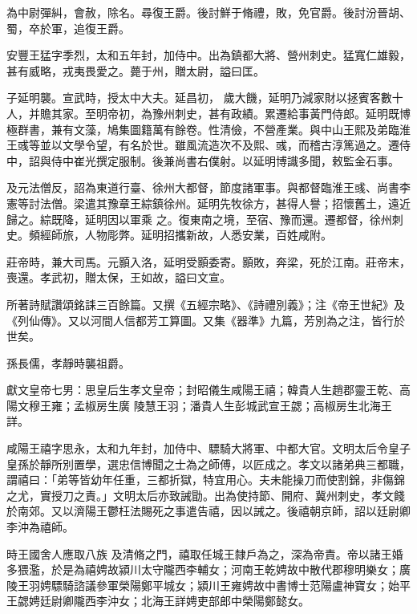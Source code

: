 \begin{pinyinscope}
 為中尉彈糾，會赦，除名。尋復王爵。後討鮮于脩禮，敗，免官爵。後討汾晉胡、蜀，卒於軍，追復王爵。



 安豐王猛字季烈，太和五年封，加侍中。出為鎮都大將、營州刺史。猛寬仁雄毅，甚有威略，戎夷畏愛之。薨于州，贈太尉，謚曰匡。



 子延明襲。宣武時，授太中大夫。延昌初，
 歲大饑，延明乃減家財以拯賓客數十人，并贍其家。至明帝初，為豫州刺史，甚有政績。累遷給事黃門侍郎。延明既博極群書，兼有文藻，鳩集圖籍萬有餘卷。性清儉，不營產業。與中山王熙及弟臨淮王彧等並以文學令望，有名於世。雖風流造次不及熙、彧，而稽古淳篤過之。遷侍中，詔與侍中崔光撰定服制。後兼尚書右僕射。以延明博識多聞，敕監金石事。



 及元法僧反，詔為東道行臺、徐州大都督，節度諸軍事。與都督臨淮王彧、尚書李憲等討法僧。梁遣其豫章王綜鎮徐州。延明先牧徐方，甚得人譽；招懷舊土，遠近歸之。綜既降，延明因以軍乘
 之。復東南之境，至宿、豫而還。遷都督，徐州刺史。頻經師旅，人物彫弊。延明招攜新故，人悉安業，百姓咸附。



 莊帝時，兼大司馬。元顥入洛，延明受顥委寄。顥敗，奔梁，死於江南。莊帝末，喪還。孝武初，贈太保，王如故，謚曰文宣。



 所著詩賦讚頌銘誄三百餘篇。又撰《五經宗略》、《詩禮別義》；注《帝王世紀》及《列仙傳》。又以河間人信都芳工算圖。又集《器準》九篇，芳別為之注，皆行於世矣。



 孫長儒，孝靜時襲祖爵。



 獻文皇帝七男：思皇后生孝文皇帝；封昭儀生咸陽王禧；韓貴人生趙郡靈王乾、高陽文穆王雍；孟椒房生廣
 陵慧王羽；潘貴人生彭城武宣王勰；高椒房生北海王詳。



 咸陽王禧字思永，太和九年封，加侍中、驃騎大將軍、中都大官。文明太后令皇子皇孫於靜所別置學，選忠信博聞之士為之師傅，以匠成之。孝文以諸弟典三都職，謂禧曰：「弟等皆幼年任重，三都折獄，特宜用心。夫未能操刀而使割錦，非傷錦之尤，實授刀之責。」文明太后亦致誡勖。出為使持節、開府、冀州刺史，孝文餞於南郊。又以濟陽王鬱枉法賜死之事遣告禧，因以誡之。後禧朝京師，詔以廷尉卿李沖為禧師。



 時王國舍人應取八族
 及清脩之門，禧取任城王隸戶為之，深為帝責。帝以諸王婚多猥濫，於是為禧娉故潁川太守隴西李輔女；河南王乾娉故中散代郡穆明樂女；廣陵王羽娉驃騎諮議參軍榮陽鄭平城女；潁川王雍娉故中書博士范陽盧神寶女；始平王勰娉廷尉卿隴西李沖女；北海王詳娉吏部郎中榮陽鄭懿女。




\end{pinyinscope}
